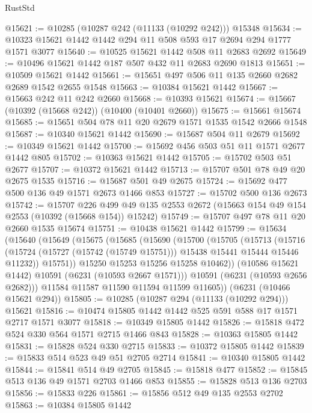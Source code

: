 \begin{lexlean}{RustStd}
\begin{coremodule}
{{@15621 := @10285 (@10287 @242 (@11133 (@10292 @242))) @15348
@15634 := @10323 @15621 @1442 @1442 @294 @11 @508 @593 @17 @2694 @294 @1777 @1571 @3077
@15640 := @10525 @15621 @1442 @508 @11 @2683 @2692
@15649 := @10496 @15621 @1442 @187 @507 @432 @11 @2683 @2690 @1813
@15651 := @10509 @15621 @1442
@15661 := @15651 @497 @506 @11 @135 @2660 @2682 @2689 @1542 @2655 @1548
@15663 := @10384 @15621 @1442
@15667 := @15663 @242 @11 @242 @2660
@15668 := @10393 @15621
@15674 := @15667 (@10392 (@15668 @242)) (@10400 (@10401 @2660))
@15675 := @15661 @15674
@15685 := @15651 @504 @78 @11 @20 @2679 @1571 @1535 @1542 @2666 @1548
@15687 := @10340 @15621 @1442
@15690 := @15687 @504 @11 @2679
@15692 := @10349 @15621 @1442
@15700 := @15692 @456 @503 @51 @11 @1571 @2677 @1442 @805
@15702 := @10363 @15621 @1442
@15705 := @15702 @503 @51 @2677
@15707 := @10372 @15621 @1442
@15713 := @15707 @501 @78 @49 @20 @2675 @1535
@15716 := @15687 @501 @49 @2675
@15724 := @15692 @477 @500 @136 @49 @1571 @2673 @1466 @853
@15727 := @15702 @500 @136 @2673
@15742 := @15707
    @226
    @499
    @49
    @135
    @2553
    @2672
    (@15663 @154 @49 @154 @2553 (@10392 (@15668 @154)) @15242)
@15749 := @15707 @497 @78 @11 @20 @2660 @1535 @15674
@15751 := @10438 @15621 @1442
@15799 := @15634
    (@15640
      (@15649
        (@15675
          (@15685
            (@15690
              (@15700
                (@15705
                  (@15713
                    (@15716
                      (@15724 (@15727 (@15742 (@15749 @15751))) @15438 @15441 @15444 @15446 @11232))
                    @15751))
                @15250
                @15253
                @15256
                @15258
                @10462))
            (@10586 @15621 @1442)
            @10591
            (@6231 (@10593 @2667 @1571)))
          @10591
          (@6231 (@10593 @2656 @2682)))
        @11584
        @11587
        @11590
        @11594
        @11599
        @11605))
    (@6231 (@10466 @15621 @294))
@15805 := @10285 (@10287 @294 (@11133 (@10292 @294))) @15621
@15816 := @10474 @15805 @1442 @1442 @525 @591 @588 @17 @1571 @2717 @1571 @3077
@15818 := @10349 @15805 @1442
@15826 := @15818 @472 @524 @330 @564 @1571 @2715 @1466 @843
@15828 := @10363 @15805 @1442
@15831 := @15828 @524 @330 @2715
@15833 := @10372 @15805 @1442
@15839 := @15833 @514 @523 @49 @51 @2705 @2714
@15841 := @10340 @15805 @1442
@15844 := @15841 @514 @49 @2705
@15845 := @15818 @477
@15852 := @15845 @513 @136 @49 @1571 @2703 @1466 @853
@15855 := @15828 @513 @136 @2703
@15856 := @15833 @226
@15861 := @15856 @512 @49 @135 @2553 @2702
@15863 := @10384 @15805 @1442
}}
\end{coremodule}
\end{lexlean}
